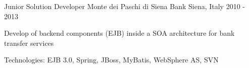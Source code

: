 \begin{cventries}
  \cventry
    {Junior Solution Developer} %
    {Monte dei Paschi di Siena Bank} %
    {Siena, Italy} %
    {2010 - 2013} %
    {
      \begin{cvitems} %
        \item {Develop of backend components (EJB) inside a SOA architecture for bank transfer services}
        \item {Technologies: EJB 3.0, Spring, JBoss, MyBatis, WebSphere AS, SVN}
      \end{cvitems}
    }

\end{cventries}
